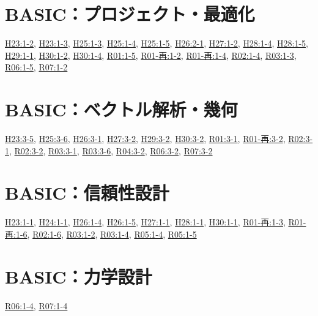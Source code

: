 \section{BASIC：プロジェクト・最適化}
\hyperref[q:h23-reg-basic-1-2]{H23:1-2}, \hyperref[q:h23-reg-basic-1-3]{H23:1-3}, \hyperref[q:h25-reg-basic-1-3]{H25:1-3}, \hyperref[q:h25-reg-basic-1-4]{H25:1-4}, \hyperref[q:h25-reg-basic-1-5]{H25:1-5}, \hyperref[q:h26-reg-basic-2-1]{H26:2-1}, \hyperref[q:h27-reg-basic-1-2]{H27:1-2}, \hyperref[q:h28-reg-basic-1-4]{H28:1-4}, \hyperref[q:h28-reg-basic-1-5]{H28:1-5}, \hyperref[q:h29-reg-basic-1-1]{H29:1-1}, \hyperref[q:h30-reg-basic-1-2]{H30:1-2}, \hyperref[q:h30-reg-basic-1-4]{H30:1-4}, \hyperref[q:r01-reg-basic-1-5]{R01:1-5}, \hyperref[q:r01-ret-basic-1-2]{R01-再:1-2}, \hyperref[q:r01-ret-basic-1-4]{R01-再:1-4}, \hyperref[q:r02-reg-basic-1-4]{R02:1-4}, \hyperref[q:r03-reg-basic-1-3]{R03:1-3}, \hyperref[q:r06-reg-basic-1-5]{R06:1-5}, \hyperref[q:r07-reg-basic-1-2]{R07:1-2}
\section{BASIC：ベクトル解析・幾何}
\hyperref[q:h23-reg-basic-3-5]{H23:3-5}, \hyperref[q:h25-reg-basic-3-6]{H25:3-6}, \hyperref[q:h26-reg-basic-3-1]{H26:3-1}, \hyperref[q:h27-reg-basic-3-2]{H27:3-2}, \hyperref[q:h29-reg-basic-3-2]{H29:3-2}, \hyperref[q:h30-reg-basic-3-2]{H30:3-2}, \hyperref[q:r01-reg-basic-3-1]{R01:3-1}, \hyperref[q:r01-ret-basic-3-2]{R01-再:3-2}, \hyperref[q:r02-reg-basic-3-1]{R02:3-1}, \hyperref[q:r02-reg-basic-3-2]{R02:3-2}, \hyperref[q:r03-reg-basic-3-1]{R03:3-1}, \hyperref[q:r03-reg-basic-3-6]{R03:3-6}, \hyperref[q:r04-reg-basic-3-2]{R04:3-2}, \hyperref[q:r06-reg-basic-3-2]{R06:3-2}, \hyperref[q:r07-reg-basic-3-2]{R07:3-2}
\section{BASIC：信頼性設計}
\hyperref[q:h23-reg-basic-1-1]{H23:1-1}, \hyperref[q:h24-reg-basic-1-1]{H24:1-1}, \hyperref[q:h26-reg-basic-1-4]{H26:1-4}, \hyperref[q:h26-reg-basic-1-5]{H26:1-5}, \hyperref[q:h27-reg-basic-1-1]{H27:1-1}, \hyperref[q:h28-reg-basic-1-1]{H28:1-1}, \hyperref[q:h30-reg-basic-1-1]{H30:1-1}, \hyperref[q:r01-ret-basic-1-3]{R01-再:1-3}, \hyperref[q:r01-ret-basic-1-6]{R01-再:1-6}, \hyperref[q:r02-reg-basic-1-6]{R02:1-6}, \hyperref[q:r03-reg-basic-1-2]{R03:1-2}, \hyperref[q:r03-reg-basic-1-4]{R03:1-4}, \hyperref[q:r05-reg-basic-1-4]{R05:1-4}, \hyperref[q:r05-reg-basic-1-5]{R05:1-5}
\section{BASIC：力学設計}
\hyperref[q:r06-reg-basic-1-4]{R06:1-4}, \hyperref[q:r07-reg-basic-1-4]{R07:1-4}
